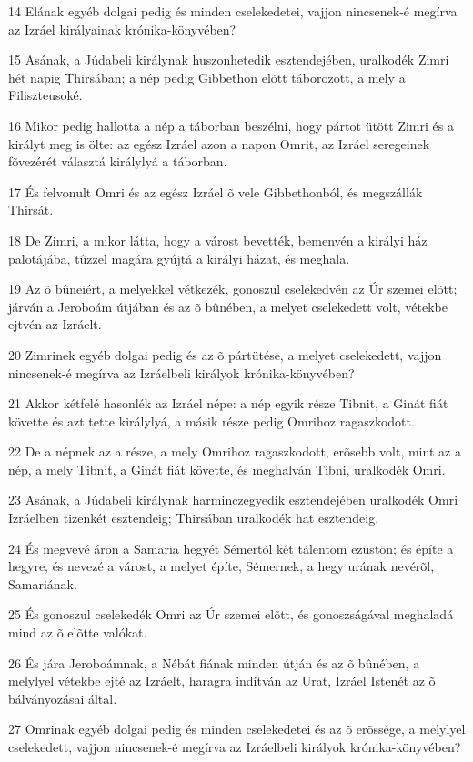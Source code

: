 \par 14 Elának egyéb dolgai pedig és minden cselekedetei, vajjon nincsenek-é megírva az Izráel királyainak krónika-könyvében?
\par 15 Asának, a Júdabeli királynak huszonhetedik esztendejében, uralkodék Zimri hét napig Thirsában; a nép pedig Gibbethon elõtt táborozott, a mely a Filiszteusoké.
\par 16 Mikor pedig hallotta a nép a táborban beszélni, hogy pártot ütött Zimri és a királyt meg is ölte: az egész Izráel azon a napon Omrit, az Izráel seregeinek fõvezérét választá királylyá a táborban.
\par 17 És felvonult Omri és az egész Izráel õ vele Gibbethonból, és megszállák Thirsát.
\par 18 De Zimri, a mikor látta, hogy a várost bevették, bemenvén a királyi ház palotájába, tûzzel magára gyújtá a királyi házat, és meghala.
\par 19 Az õ bûneiért, a melyekkel vétkezék, gonoszul cselekedvén az Úr szemei elõtt; járván a Jeroboám útjában és az õ bûnében, a melyet cselekedett volt, vétekbe ejtvén az Izráelt.
\par 20 Zimrinek egyéb dolgai pedig és az õ pártütése, a melyet cselekedett, vajjon nincsenek-é megírva az Izráelbeli királyok krónika-könyvében?
\par 21 Akkor kétfelé hasonlék az Izráel népe: a nép egyik része Tibnit, a Ginát fiát követte és azt tette királylyá, a másik része pedig Omrihoz ragaszkodott.
\par 22 De a népnek az a része, a mely Omrihoz ragaszkodott, erõsebb volt, mint az a nép, a mely Tibnit, a Ginát fiát követte, és meghalván Tibni, uralkodék Omri.
\par 23 Asának, a Júdabeli királynak harminczegyedik esztendejében uralkodék Omri Izráelben tizenkét esztendeig; Thirsában uralkodék hat esztendeig.
\par 24 És megvevé áron a Samaria hegyét Sémertõl két tálentom ezüstön; és építe a hegyre, és nevezé a várost, a melyet építe, Sémernek, a hegy urának nevérõl, Samariának.
\par 25 És gonoszul cselekedék Omri az Úr szemei elõtt, és gonoszságával meghaladá mind az õ elõtte valókat.
\par 26 És jára Jeroboámnak, a Nébát fiának minden útján és az õ bûnében, a melylyel vétekbe ejté az Izráelt, haragra indítván az Urat, Izráel Istenét az õ bálványozásai által.
\par 27 Omrinak egyéb dolgai pedig és minden cselekedetei és az õ erõssége, a melylyel cselekedett, vajjon nincsenek-é megírva az Izráelbeli királyok krónika-könyvében?
